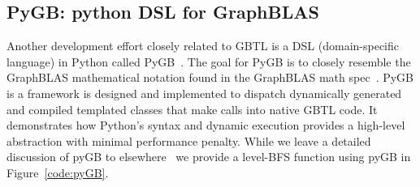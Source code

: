 \subsection{PyGB: python DSL for GraphBLAS}

Another development effort closely related to GBTL is a DSL (domain-specific language) in Python called PyGB~\cite{Chamberlin2016}.  
The goal for PyGB is to closely resemble the GraphBLAS mathematical notation found in the GraphBLAS math spec~\cite{mathgraphblas16}.  
PyGB is a framework is designed and implemented to dispatch dynamically generated and compiled templated 
classes that make calls into native GBTL code.  It demonstrates how Python's syntax and dynamic execution provides 
a high-level abstraction with minimal performance penalty.  While we leave a detailed discussion of pyGB to elsewhere~\cite{Chamberlin2016}
we provide a level-BFS function using pyGB in Figure~\ref{code:pyGB}.

